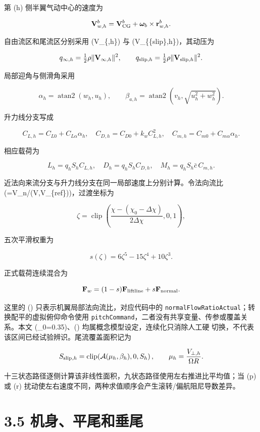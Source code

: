 \documentclass[UTF8,11pt,oneside,openany,fontset=windows]{ctexbook}
\begin{document}
第 (h) 侧半翼气动中心的速度为

\[
\mathbf V_{w,h}^b=\mathbf V_{\rm CG}^b+\boldsymbol\omega_b\times\mathbf r_{w,h}^b .
\]

自由流区和尾流区分别采用 (\mathbf V\_\{\infty,h\}) 与
(\mathbf V\_\{\{\rm slip\},h\})，其动压为

\[
q_{\infty,h}=\tfrac12\rho\|\mathbf V_{\infty,h}\|^2,\qquad
q_{{\rm slip},h}=\tfrac12\rho\|\mathbf V_{{\rm slip},h}\|^2.
\]

局部迎角与侧滑角采用

\[
\alpha_h=\operatorname{atan2}(w_h,u_h),\qquad
\beta_{a,h}=\operatorname{atan2}(v_h,\sqrt{u_h^2+w_h^2}).
\]

升力线分支写成

\[
C_{L,h}=C_{L0}+C_{L\alpha}\alpha_h,\quad
C_{D,h}=C_{D0}+k_wC_{L,h}^2,\quad
C_{m,h}=C_{m0}+C_{m\alpha}\alpha_h .
\]

相应载荷为

\[
L_h=q_hS_hC_{L,h},\quad D_h=q_hS_hC_{D,h},\quad
M_h=q_hS_h\bar c\,C_{m,h}.
\]

近法向来流分支与升力线分支在同一局部速度上分别计算。令法向流比
(\chi=\textbar V\_n\textbar/\max(\textbar{}\mathbf V\textbar,V\_\{\rm ref\}))，过渡坐标为

\[
\zeta=\operatorname{clip}\left(\frac{\chi-(\chi_0-\Delta\chi)}
{2\Delta\chi},0,1\right),
\]

五次平滑权重为

\[
s(\zeta)=6\zeta^5-15\zeta^4+10\zeta^3.
\]

正式载荷连续混合为

\[
\mathbf F_w=(1-s)\mathbf F_{\rm liftline}+s\mathbf F_{\rm normal}.
\]

这里的 (\chi) 只表示机翼局部法向流比，对应代码中的
\texttt{normalFlowRatioActual}；转换配平的虚拟俯仰命令使用
\texttt{pitchCommand}，二者没有共享变量、传参或覆盖关系。本文
(\chi\_0=0.35)、(\Delta{}) 均属概念模型设定，连续化只消除人工硬
切换，不代表该区间已经试验辨识。尾流覆盖面积记为

\[
S_{{\rm slip},h}=\operatorname{clip}\!\left(\mathcal A(\mu_h,\beta_h),0,S_h\right),
\qquad \mu_h=\frac{V_{\perp,h}}{\Omega R}.
\]

十三状态路径逐侧计算该非线性面积，九状态路径使用左右推进比平均值；当 (p)
或 (r) 扰动使左右速度不同，两种求值顺序会产生滚转/偏航阻尼导数差异。

\section{3.5
机身、平尾和垂尾}\label{ux673aux8eabux5e73ux5c3eux548cux5782ux5c3e}
\end{document}
